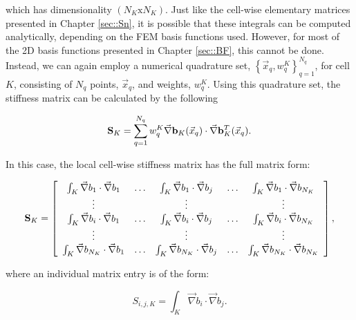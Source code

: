 \noindent which has dimensionality $(N_K \text{x} N_K)$. Just like the cell-wise elementary matrices presented in Chapter \ref{sec::Sn}, it is possible that these integrals can be computed analytically, depending on the FEM basis functions used. However, for most of the 2D basis functions presented in Chapter \ref{sec::BF}, this cannot be done. Instead, we can again employ a numerical quadrature set, $\left\{  \vec{x}_q , w_q^{K}  \right\}_{q=1}^{N_q}$, for cell $K$, consisting of $N_q$ points, $\vec{x}_q$, and weights, $w_q^K$. Using this quadrature set, the stiffness matrix can be calculated by the following

\begin{equation}
\label{eq::DSA_stiffness_matrix_numerical}
{\bf S}_K = \sum_{q = 1}^{N_q} w_{q}^K \vec{\nabla} {\bf b}_K (\vec{x}_q) \cdot  \vec{\nabla}{\bf b}_K^T (\vec{x}_q)  .
\end{equation}

\noindent In this case, the local cell-wise stiffness matrix has the full matrix form:

\begin{equation}
\label{eq::DSA_stiffness_matrix_array}
{\bf S}_K =   \left[
\begin{array} {ccccc}
	\int_K \vec{\nabla}b_1 \cdot \vec{\nabla} b_1  & \ldots & \int_K \vec{\nabla}b_1 \cdot \vec{\nabla} b_j  & \ldots & \int_K \vec{\nabla}b_1 \cdot \vec{\nabla}b_{N_K} \\
	\vdots  &  & \vdots  &  & \vdots \\
	\int_K \vec{\nabla} b_i \cdot \vec{\nabla} b_1  & \ldots & \int_K \vec{\nabla}b_i \cdot \vec{\nabla} b_j  & \ldots & \int_K \vec{\nabla}b_i \cdot \vec{\nabla}b_{N_K} \\
	\vdots  &  & \vdots  &  & \vdots \\
	\int_K \vec{\nabla} b_{N_K}\cdot \vec{\nabla} b_1  & \ldots & \int_K \vec{\nabla} b_{N_K}\cdot \vec{\nabla} b_j  & \ldots & \int_K \vec{\nabla} b_{N_K} \cdot \vec{\nabla} b_{N_K} \\
\end{array}
\right] ,
\end{equation}

\noindent where an individual matrix entry is of the form:

\begin{equation}
\label{eq::DSA_stiffness_matrix_entry}
S_{i,j,K} =  \int_K \vec{\nabla}b_i \cdot \vec{\nabla} b_j .
\end{equation}

